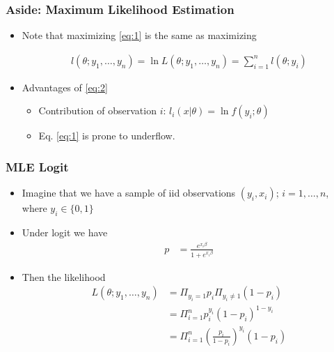 \documentclass[
  shownotes,
  xcolor={svgnames},
  hyperref={colorlinks,citecolor=DarkBlue,linkcolor=andesred,urlcolor=DarkBlue}
  , aspectratio=169]{beamer}
\begin{document}
\begin{frame}[fragile]
\frametitle{Aside: Maximum Likelihood Estimation}

\begin{itemize}
\item Note that maximizing \eqref{eq:1} is the same as maximizing

\begin{align}\label{eq:2}
l(\theta;y_1,\dots,y_n)=\ln L(\theta;y_1,\dots,y_n)=\sum_{i=1}^n l(\theta;y_i)
\end{align}


\item Advantages of \eqref{eq:2}
\medskip
\begin{itemize}
\item Contribution of observation $i$:  $l_i(x|\theta)=\ln f(y_i;\theta)$
\medskip
\item Eq. \eqref{eq:1} is  prone to underflow. 
\end{itemize}
\end{itemize}


\end{frame}
\begin{frame}[fragile]
\frametitle{MLE Logit}
\begin{itemize}
\item Imagine that we have a sample of iid observations $(y_i,x_i)$; $i=1,\dots,n$, where $y_i\in\{0,1\}$
\medskip
\item Under logit we have
\begin{align}
p &=\frac{e^{x_i\beta}}{1+e^{x_i\beta}}
\end{align}
\item Then the likelihood
\begin{align}
L(\theta;y_1,\dots,y_n) &=\Pi_{y_i=1}p_i\Pi_{y_i\neq1}(1-p_i) \\
                        &=\Pi^n_{i=1}p_i^{y_i}(1-p_i)^{1-y_i} \\
                        &=\Pi^n_{i=1}\left(\frac{p_i}{1-p_i}\right)^{y_i}(1-p_i)
\end{align}

\end{itemize}

\end{frame}
\end{document}
